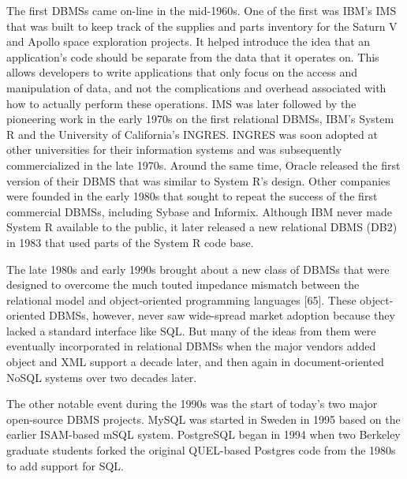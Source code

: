 \documentclass[a4paper,11pt,twoside,openright]{article}
\begin{document}
The first DBMSs came on-line in the mid-1960s. One of the first was
IBM's IMS that was built to keep track of the supplies and parts
inventory for the Saturn V and Apollo space exploration projects. It
helped introduce the idea that an application's code should be separate
from the data that it operates on. This allows developers to write
applications that only focus on the access and manipulation of data, and
not the complications and overhead associated with how to actually
perform these operations. IMS was later followed by the pioneering work
in the early 1970s on the first relational DBMSs, IBM's System R and the
University of California's INGRES. INGRES was soon adopted at other
universities for their information systems and was subsequently
commercialized in the late 1970s. Around the same time, Oracle released
the first version of their DBMS that was similar to System R's design.
Other companies were founded in the early 1980s that sought to repeat
the success of the first commercial DBMSs, including Sybase and
Informix. Although IBM never made System R available to the public, it
later released a new relational DBMS (DB2) in 1983 that used parts of
the System R code base.

The late 1980s and early 1990s brought about a new class of DBMSs that
were designed to overcome the much touted impedance mismatch between the
relational model and object-oriented programming languages {[}65{]}.
These object-oriented DBMSs, however, never saw wide-spread market
adoption because they lacked a standard interface like SQL. But many of
the ideas from them were eventually incorporated in relational DBMSs
when the major vendors added object and XML support a decade later, and
then again in document-oriented NoSQL systems over two decades later.

The other notable event during the 1990s was the start of today's two
major open-source DBMS projects. MySQL was started in Sweden in 1995
based on the earlier ISAM-based mSQL system. PostgreSQL began in 1994
when two Berkeley graduate students forked the original QUEL-based
Postgres code from the 1980s to add support for SQL.
\end{document}

